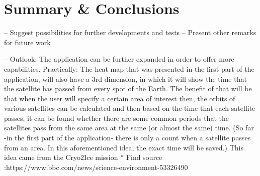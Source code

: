\chapter{Summary \& Conclusions}
\label{chap:5}

--  Suggest possibilities for further developments and tests
--  Present other remarks for future work

-- Outlook:
The application can be further expanded in order to offer more capabilities. Practically: The heat map that was presented in the first part of the application, will also have a 3rd dimension, in which it will show the time that the satellite has passed from every spot of the Earth. The benefit of that will be that when the user will specify a certain area of interest then, the orbits of various satellites can be calculated and then based on the time that each satellite passes, it can be found whether there are some common periods that the satellites pass from the same area at the same (or almost the same) time. 
(So far -in the first part of the application- there is only a count when a satellite passes from an area. In this aforementioned idea, the exact time will be saved.)
This idea came from the Cryo2Ice mission * Find source :https://www.bbc.com/news/science-environment-53326490
